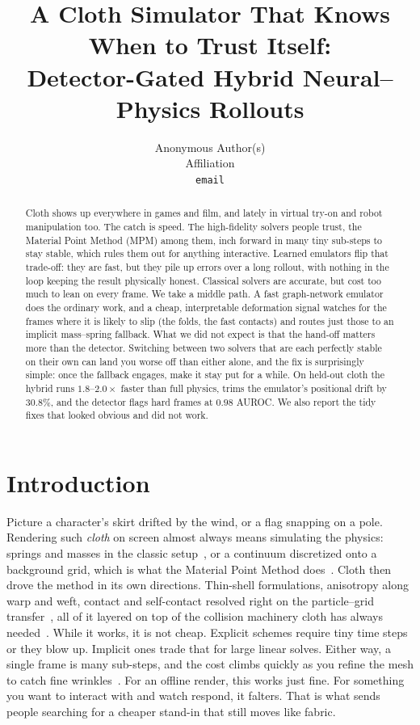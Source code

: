 \documentclass{article}
\title{A Cloth Simulator That Knows When to Trust Itself:\\
Detector-Gated Hybrid Neural--Physics Rollouts}
\author{%
  Anonymous Author(s)\\
  Affiliation\\
  \texttt{email}
}
\begin{document}
\maketitle

\begin{abstract}
Cloth shows up everywhere in games and film, and lately in virtual try-on and
robot manipulation too. The catch is speed. The high-fidelity solvers people
trust, the Material Point Method (MPM) among them, inch forward in many tiny
sub-steps to stay stable, which rules them out for anything interactive. Learned
emulators flip that trade-off: they are fast, but they pile up errors over a
long rollout, with nothing in the loop keeping the result physically honest. Classical solvers are accurate, but cost too much to
lean on every frame. We take a middle path. A fast graph-network emulator does the
ordinary work, and a cheap, interpretable deformation signal watches for the
frames where it is likely to slip (the folds, the fast contacts) and routes just
those to an implicit mass--spring fallback. What we did not expect is that the
hand-off matters more than the detector. Switching between two solvers that are
each perfectly stable on their own can land you worse off than either alone, and
the fix is surprisingly simple: once the fallback engages, make it stay put for a
while. On held-out cloth the hybrid runs $1.8$--$2.0\times$ faster than full
physics, trims the emulator's positional drift by $30.8\%$, and the detector flags
hard frames at $0.98$ AUROC. We also report the tidy fixes that looked obvious and
did not work.
\end{abstract}

\section{Introduction}

Picture a character's skirt drifted by the wind, or a flag snapping on a pole.
Rendering such \emph{cloth} on screen almost always means simulating the
physics: springs and masses in the classic setup~\citep{baraff1998}, or a
continuum discretized onto a background grid, which is what the Material Point
Method does~\citep{jiang2016mpm, hu2018mlsmpm, stomakhin2013snow}. Cloth then
drove the method in its own directions. Thin-shell formulations, anisotropy along
warp and weft, contact and self-contact resolved right on the particle--grid
transfer~\citep{guo2018thinshells, wolper2020anisompm}, all of it layered on top of
the collision machinery cloth has always needed~\citep{bridson2002collisions}. While it works, it is not cheap. Explicit schemes require tiny time steps or they blow up.
Implicit ones trade that for large linear solves. Either way, a single frame is many
sub-steps, and the cost climbs quickly as you refine the mesh to catch fine
wrinkles~\citep{zhang2025clothres}. For an offline render, this works just fine. For something you
want to interact with and watch respond, it falters. That is what sends people searching for a
cheaper stand-in that still moves like fabric.
\end{document}
